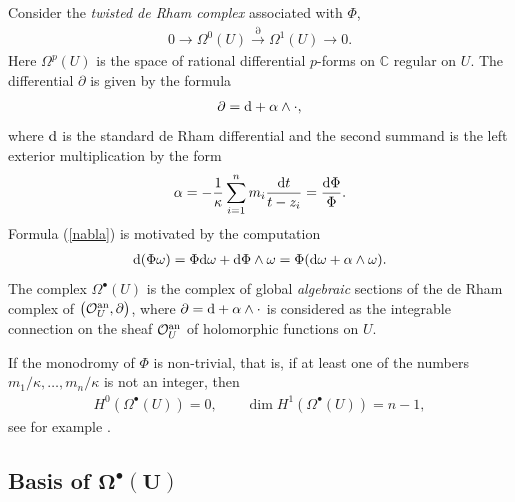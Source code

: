 \documentclass[pdftex]{sigma}
\numberwithin{equation}{section}
\begin{document}
Consider the {\em twisted de Rham complex} associated with $\Phi$,
\begin{gather}\label{dr com}
0\longrightarrow \Omega^0(U)\overset{\partial}{\longrightarrow}\Omega^1(U) \longrightarrow 0.
\end{gather}
Here $\Omega^p(U)$ is the space of rational differential $p$-forms on ${\mathbb C}$ regular on $U$. The differential $\partial$ is given by the formula
\begin{gather}\label{nabla}
\partial={\rm d}+\alpha\wedge\cdot ,
\end{gather}
where ${\rm d}$ is the standard de Rham differential and the second summand is the left exterior multiplication by the form
\begin{gather*}%
\alpha=-\frac{1}{\kappa}\sum_{i=1}^n m_i \frac{{\rm d}t}{t-z_i} =\frac{{\rm d}\Phi}\Phi.
\end{gather*}
Formula (\ref{nabla}) is motivated by the computation
\begin{gather*}
{\rm d}(\Phi\omega)=\Phi {\rm d}\omega+{\rm d}\Phi\wedge\omega=\Phi({\rm d}\omega+\alpha\wedge\omega).
\end{gather*}
The complex $\Omega^{\bullet}(U)$ is the complex of global {\em algebraic} sections of
the de Rham complex of $\big({\mathcal{O}}^{\rm an}_U,\partial\big)$, where $\partial={\rm d}+\alpha\wedge\cdot$ is considered as the integrable connection on the sheaf ${\mathcal{O}}^{\rm an}_U$ of holomorphic functions on $U$.

If the monodromy of $\Phi$ is non-trivial, that is, if at least one of the numbers $m_1/\kappa, \dots, m_n/\kappa$ is not an integer, then
\begin{gather*}
H^0(\Omega^{\bullet}(U))=0,\qquad \dim H^1(\Omega^{\bullet}(U))=n-1,
\end{gather*}
see for example \cite{STV}.

\subsection[Basis of $\Omega^{\bullet}(U)$]{Basis of $\boldsymbol{\Omega^{\bullet}(U)}$} \label{Basis of Omega}
\end{document}
